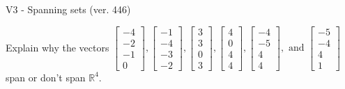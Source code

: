 \begin{exercise}
  \begin{exerciseTitle}V3 - Spanning sets (ver. 446)\end{exerciseTitle}
  \begin{exerciseStatement}
    Explain why the vectors \(\left[\begin{array}{r}
-4 \\
-2 \\
-1 \\
0
\end{array}\right] , \left[\begin{array}{r}
-1 \\
-4 \\
-3 \\
-2
\end{array}\right] , \left[\begin{array}{r}
3 \\
3 \\
0 \\
3
\end{array}\right] , \left[\begin{array}{r}
4 \\
0 \\
4 \\
4
\end{array}\right] , \left[\begin{array}{r}
-4 \\
-5 \\
4 \\
4
\end{array}\right] , \text{ and } \left[\begin{array}{r}
-5 \\
-4 \\
4 \\
1
\end{array}\right]\) span or don't span \(\mathbb{R}^4\). 
	



\end{exerciseStatement}
\end{exercise}
